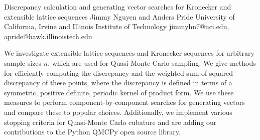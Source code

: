 \begin{talk}
  {Discrepancy calculation and generating vector searches for Kronecker and extensible lattice sequences}%
  {Jimmy Nguyen and Anders Pride}%
  {University of California, Irvine and Illinois Institute of Technology}%
  {jimmyhn7@uci.edu, apride@hawk.illinoistech.edu}%
  {}%
  {}%
  {}%
  {}%
  {}%

We investigate extensible lattice sequences and Kronecker sequences for arbitrary sample sizes $n$, which are used for Quasi-Monte Carlo sampling. We give methods for efficiently computing the discrepancy and the weighted sum of squared discrepancy of these points, where the discrepancy is defined in terms of a symmetric, positive definite, periodic kernel of product form. We use these measures to perform component-by-component searches for generating vectors and compare these to popular choices. Additionally, we implement various stopping criteria for Quasi-Monte Carlo cubature and are adding our contributions to the Python QMCPy open source library.



\end{talk}

